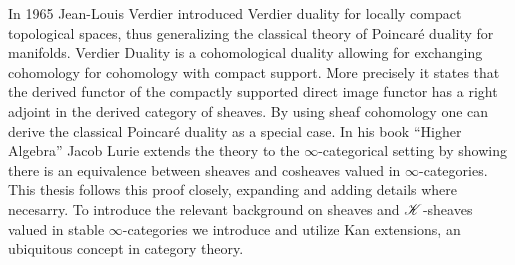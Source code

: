 \documentclass[../thesis.tex]{subfiles}
\begin{document}
In 1965 Jean-Louis Verdier introduced Verdier duality for locally compact topological spaces, thus generalizing the classical theory of Poincaré duality for manifolds.
Verdier Duality is a cohomological duality allowing for exchanging cohomology for cohomology with compact support.
More precisely it states that the derived functor of the compactly supported direct image functor has a right adjoint in the derived category of sheaves.
By using sheaf cohomology one can derive the classical Poincaré duality as a special case.
In his book ``Higher Algebra'' Jacob Lurie extends the theory to the $\infty$-categorical setting by showing there is an equivalence between sheaves and cosheaves valued in $\infty$-categories.
This thesis follows this proof closely, expanding and adding details where necesarry.
To introduce the relevant background on sheaves and $\mathscr{K}$-sheaves valued in stable $\infty$-categories we introduce and utilize Kan extensions, an ubiquitous concept in category theory.
\end{document}
